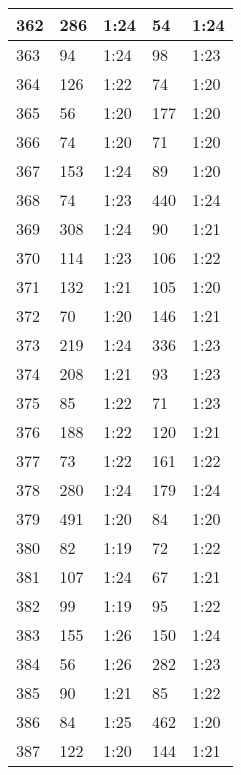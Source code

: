 \begin{center}
\begin{longtable}{|p{2cm}|l|l|l|l|}
362	&   286           &  1:24  &		54          & 1:24 \\ \hline
363	&   94            &  1:24  &		98      	& 1:23 \\ \hline
364	&   126           &  1:22  &		74      	& 1:20 \\ \hline
365	&   56            &  1:20  &		177     	& 1:20 \\ \hline
366	&   74            &  1:20  &		71      	& 1:20 \\ \hline
367	&   153           &  1:24  &		89      	& 1:20 \\ \hline
368	&   74            &  1:23  &		440     	& 1:24 \\ \hline
369	&   308           &  1:24  &		90      	& 1:21 \\ \hline
370	&   114           &  1:23  &		106     	& 1:22 \\ \hline
371	&   132           &  1:21  &		105     	& 1:20 \\ \hline
372	&   70            &  1:20  &		146     	& 1:21 \\ \hline
373	&   219           &  1:24  &		336     	& 1:23 \\ \hline
374	&   208           &  1:21  &		93      	& 1:23 \\ \hline
375	&   85            &  1:22  &		71      	& 1:23 \\ \hline
376	&   188           &  1:22  &		120     	& 1:21 \\ \hline
377	&   73            &  1:22  &		161     	& 1:22 \\ \hline
378	&   280           &  1:24  &		179     	& 1:24 \\ \hline
379	&   491           &  1:20  &		84      	& 1:20 \\ \hline
380	&   82            &  1:19  &		72      	& 1:22 \\ \hline
381	&   107           &  1:24  &		67          & 1:21 \\ \hline
382	&   99            &  1:19  &		95      	& 1:22 \\ \hline
383	&   155           &  1:26  &		150     	& 1:24 \\ \hline
384	&   56            &  1:26  &		282     	& 1:23 \\ \hline
385	&   90            &  1:21  &		85      	& 1:22 \\ \hline
386	&   84            &  1:25  &		462     	& 1:20 \\ \hline
387	&   122           &  1:20  &		144     	& 1:21 \\ \hline

\end{longtable}
\end{center}
